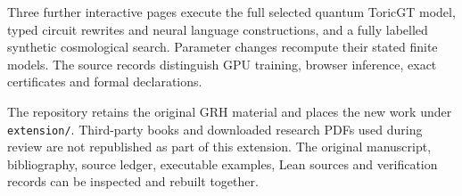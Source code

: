 Three further interactive pages execute the full selected quantum ToricGT model, typed circuit rewrites and neural language constructions, and a fully labelled synthetic cosmological search. Parameter changes recompute their stated finite models. The source records distinguish GPU training, browser inference, exact certificates and formal declarations.

The repository retains the original GRH material and places the new work under \texttt{extension/}. Third-party books and downloaded research PDFs used during review are not republished as part of this extension. The original manuscript, bibliography, source ledger, executable examples, Lean sources and verification records can be inspected and rebuilt together.
